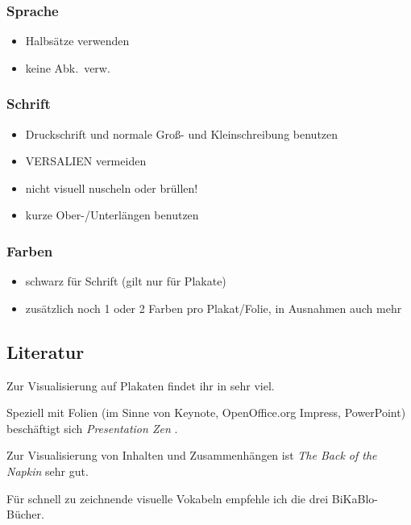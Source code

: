 \subsubsection{Sprache}
\begin{itemize}
    \item Halbsätze verwenden
    \item keine Abk.~verw.
\end{itemize}

\subsubsection{Schrift}
\begin{itemize}
    \item Druckschrift und normale Groß- und Kleinschreibung benutzen
    \item VERSALIEN vermeiden
    \item nicht visuell {\tiny nuscheln} oder {\LARGE brüllen}!
    \item kurze Ober-/Unterlängen benutzen
\end{itemize}

\subsubsection{Farben}
\begin{itemize}
    \item schwarz für Schrift (gilt nur für Plakate)
    \item zusätzlich noch 1 oder 2 Farben pro Plakat/Folie, in Ausnahmen auch mehr
\end{itemize}

\subsection{Literatur}
Zur Visualisierung auf Plakaten findet ihr in \cite{visualisieren-praesentieren-moderieren} sehr viel.

Speziell mit Folien (im Sinne von Keynote, OpenOffice.org Impress, PowerPoint) beschäftigt sich \emph{Presentation Zen} \cite{presentation-zen}.

Zur Visualisierung von Inhalten und Zusammenhängen ist \emph{The Back of the Napkin} \cite{napkin} sehr gut.

Für schnell zu zeichnende visuelle Vokabeln empfehle ich die drei BiKaBlo-Bücher. \cite{bikablo, bikablo-2, bikablo-emotions}
